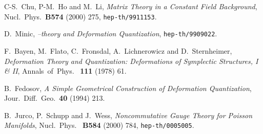 \documentclass[a4paper,11pt]{article}
\begin{document}
\begin{thebibliography}{99}
{  {\small C-S.~Chu, P-M.~Ho and M.~Li, \textit{Matrix Theory in
a Constant \coordHE{} Field Background}, Nucl.\ Phys.\ \textbf{B574} (2000) 275, 
\texttt{hep-th/9911153}. }

  {\small D.~Minic, \textit{\coordHE{}--theory and Deformation
Quantization}, \texttt{hep-th/9909022}. }

  {\small F.~Bayen, M.~Flato, C.~Fronsdal, A.~Lichnerowicz
and D.~Sternheimer, \textit{Deformation Theory and Quantization:
Deformations of Symplectic Structures, I \& II}, Annals\ of\ Phys.\ \textbf{
111} (1978) 61. }

  {\small B.~Fedosov, \textit{A Simple Geometrical
Construction of Deformation Quantization}, Jour.\ Diff.\ Geo.\ \textbf{40}
(1994) 213. }

  {\small B.~Jurco, P.~Schupp and J.~Wess, \textit{
Noncommutative Gauge Theory for Poisson Manifolds}, Nucl.\ Phys.\ \textbf{
B584} (2000) 784, \texttt{hep-th/0005005}. }

}

\end{thebibliography}
\end{document}
